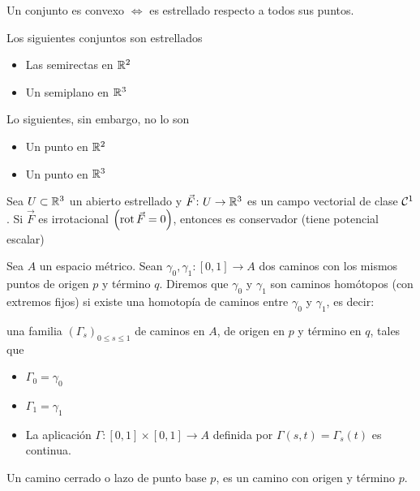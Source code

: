 \begin{obs*}
    Un conjunto es convexo $\iff$ es estrellado respecto a todos sus puntos.
\end{obs*}

\begin{example*}
    Los siguientes conjuntos son estrellados
    \begin{itemize}
        \item Las semirectas en $\mathbb{R}^2$
        \item Un semiplano en $\mathbb{R}^3$
    \end{itemize}
    Lo siguientes, sin embargo, no lo son
    \begin{itemize}
        \item Un punto en $\mathbb{R}^2$
        \item Un punto en $\mathbb{R}^3$
    \end{itemize}
\end{example*}

\begin{lema}[de Poincar\'e]
    Sea $U \subset \mathbb{R}^3$ un abierto estrellado y $\vec{F} \colon U \to \mathbb{R}^3$ es un campo vectorial
    de clase $\mathcal{C}^1$. Si $\vec{F}$ es irrotacional $\left( \operatorname{rot} \vec{F} = 0 \right)$, entonces es conservador
    (tiene potencial escalar)
\end{lema}

\begin{defi}
    Sea $A$ un espacio m\'etrico. Sean $\gamma_0, \gamma_1 \colon [0,1] \to A$ dos caminos con los mismos puntos
    de origen $p$ y t\'ermino $q$. Diremos que $\gamma_0$ y $\gamma_1$ son caminos homótopos (con extremos fijos)
    si existe una homotopía de caminos entre $\gamma_0$ y $\gamma_1$, es decir:
    
    una familia $\left( \Gamma_s \right)_{0 \leq s \leq 1}$ de caminos en $A$, de origen en $p$ y t\'ermino en $q$,
    tales que
    \begin{itemize}
        \item $\Gamma_0 = \gamma_0$
        \item $\Gamma_1 = \gamma_1$
        \item La aplicación $\Gamma \colon [0,1] \times [0,1] \to A$ definida por $\Gamma(s,t) = \Gamma_s(t)$ es continua.
    \end{itemize}
\end{defi}
\begin{defi*}
    Un camino cerrado o lazo de punto base $p$, es un camino con origen y t\'ermino $p$.
\end{defi*}

